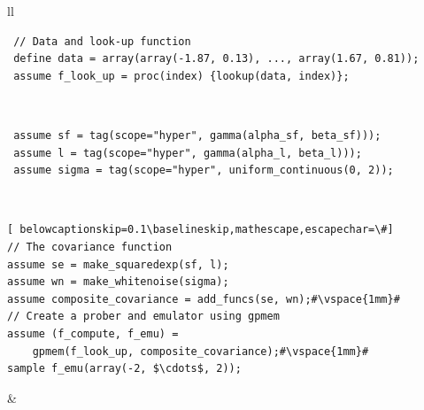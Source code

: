 \begin{tabular}{ll} \hline
{}
  \begin{minipage}{4cm}
 \footnotesize\begin{lstlisting}
 // Data and look-up function
 define data = array(array(-1.87, 0.13), ..., array(1.67, 0.81));
 assume f_look_up = proc(index) {lookup(data, index)};
\end{lstlisting}
\end{minipage}\\
\hline
{}
  \begin{minipage}{4cm}
 \footnotesize\begin{lstlisting}
 assume sf = tag(scope="hyper", gamma(alpha_sf, beta_sf)));
 assume l = tag(scope="hyper", gamma(alpha_l, beta_l)));
 assume sigma = tag(scope="hyper", uniform_continuous(0, 2));
\end{lstlisting}
\end{minipage}
  \\
\hline
\footnotesize\begin{lstlisting}[ belowcaptionskip=0.1\baselineskip,mathescape,escapechar=\#]
// The covariance function
assume se = make_squaredexp(sf, l);
assume wn = make_whitenoise(sigma);
assume composite_covariance = add_funcs(se, wn);#\vspace{1mm}#
// Create a prober and emulator using gpmem
assume (f_compute, f_emu) =
    gpmem(f_look_up, composite_covariance);#\vspace{1mm}#
sample f_emu(array(-2, $\cdots$, 2));
\end{lstlisting}
 &
  \\ \hline


\end{tabular}
